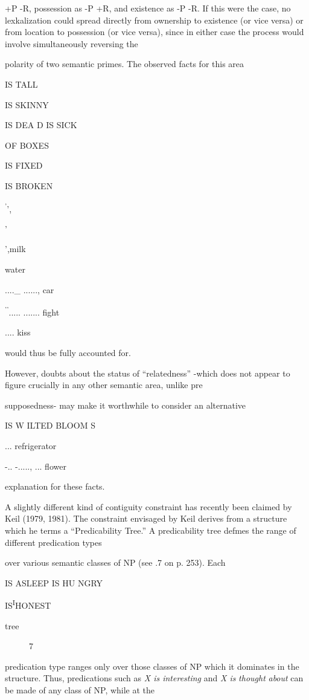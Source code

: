 +P {}-R, possession as {}-P +R, and existence as {}-P {}-R. If this were the case, no lexkalization could spread directly from ownership to exis\-tence (or vice versa) or from location to possession (or vice versa), since in either case the process would involve simultaneously reversing the

polarity of two semantic primes. The observed facts for this area

IS TALL

IS SKINNY 

IS DEA D IS SICK

OF BOXES

IS FIXED

IS BROKEN

\textsuperscript{'}',

'

',milk

water

....\_ ......, car

\textsuperscript{'}\textsuperscript{'}..... ....... fight

.... kiss

would thus be fully accounted for. 

However, doubts about the status of ``relatedness'' {}-which does not appear to figure crucially in any other semantic area, unlike pre\-

supposedness- may make it worthwhile to consider an alternative

IS W ILTED BLOOM S 

... refrigerator

{}-.. {}-....., ... flower

explanation for these facts.

A slightly different kind of contiguity constraint has recently been claimed by Keil (1979, 1981). The constraint envisaged by Keil derives from a structure which he terms a ``Predicability Tree.'' A predicability tree defmes the range of different predication types

over various semantic classes of NP (see .7 on p. 253). Each

IS ASLEEP IS HU NGRY

IS\textsuperscript{I}HONEST 

tree

\begin{figure}
\caption{7}
\label{fig:4}
\end{figure}

predication type ranges only over those classes of NP which it domi\-nates in the structure. Thus, predications such as \textit{X is interesting} and \textit{X is} \textit{thought} \textit{about} can be made of any class of NP, while at the

